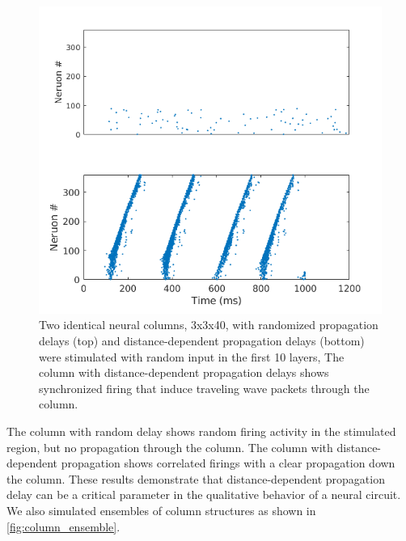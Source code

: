 \documentclass[a4paper,11pt]{article}
\begin{document}
\begin{figure}[ht]
 \caption{Two identical neural columns, 3x3x40, with randomized propagation delays (top) and distance-dependent propagation delays (bottom) were stimulated with random input in the first 10 layers,
 The column with distance-dependent propagation delays shows synchronized firing that induce traveling wave packets through the column.}
 \label{fig:delaycompare}
 \centering
   \includegraphics[width=\textwidth]{fig/DelayCompare_RandInput}
\end{figure}
The column with random delay shows random firing activity in the stimulated region, but no propagation through the column.
The column with distance-dependent propagation shows correlated firings with a clear propagation down the column.
These results demonstrate that distance-dependent propagation delay can be a critical parameter in the qualitative behavior of a neural circuit.\\
We also simulated ensembles of column structures as shown in \ref{fig:column_ensemble}.
\end{document}
